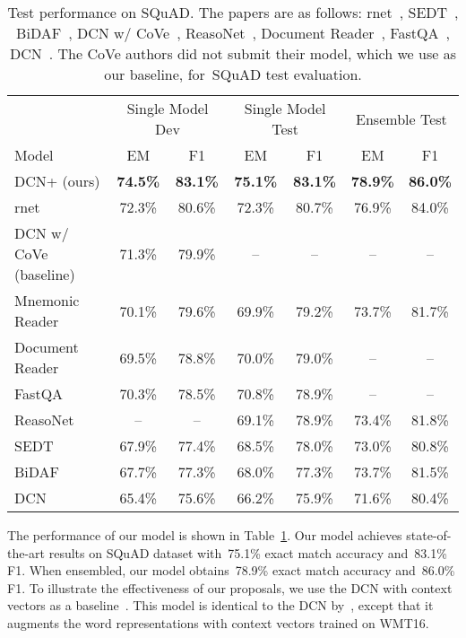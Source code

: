 \documentclass{article} \usepackage{iclr2018_conference,times}
\newcommand{\squad}{SQuAD\xspace}
\newcommand{\devemours}{74.5\%\xspace}
\newcommand{\devfours}{83.1\%\xspace}
\newcommand{\emours}{75.1\%\xspace}
\newcommand{\fours}{83.1\%\xspace}
\newcommand{\emoursensemble}{78.9\%\xspace}
\newcommand{\foursensemble}{86.0\%\xspace}
\newcommand{\devemdcn}{65.4\%\xspace}
\newcommand{\devfdcn}{75.6\%\xspace}
\newcommand{\emdcn}{66.2\%\xspace}
\newcommand{\fdcn}{75.9\%\xspace}
\newcommand{\emdcnensemble}{71.6\%\xspace}
\newcommand{\fdcnensemble}{80.4\%\xspace}
\newcommand{\devembidaf}{67.7\%\xspace}
\newcommand{\devfbidaf}{77.3\%\xspace}
\newcommand{\embidaf}{68.0\%\xspace}
\newcommand{\fbidaf}{77.3\%\xspace}
\newcommand{\embidafensemble}{73.7\%\xspace}
\newcommand{\fbidafensemble}{81.5\%\xspace}
\newcommand{\devemsedtbidaf}{67.9\%\xspace}
\newcommand{\devfsedtbidaf}{77.4\%\xspace}
\newcommand{\emsedtbidaf}{68.5\%\xspace}
\newcommand{\fsedtbidaf}{78.0\%\xspace}
\newcommand{\emsedtbidafensemble}{73.0\%\xspace}
\newcommand{\fsedtbidafensemble}{80.8\%\xspace}
\newcommand{\devemmr}{70.1\%\xspace}
\newcommand{\devfmr}{79.6\%\xspace}
\newcommand{\emmr}{69.9\%\xspace}
\newcommand{\fmr}{79.2\%\xspace}
\newcommand{\emmrensemble}{73.7\%\xspace}
\newcommand{\fmrensemble}{81.7\%\xspace}
\newcommand{\devemrnet}{72.3\%\xspace}
\newcommand{\devfrnet}{80.6\%\xspace}
\newcommand{\emrnet}{72.3\%\xspace}
\newcommand{\frnet}{80.7\%\xspace}
\newcommand{\emrnetensemble}{76.9\%\xspace}
\newcommand{\frnetensemble}{84.0\%\xspace}
\newcommand{\devemdocreader}{69.5\%\xspace}
\newcommand{\devfdocreader}{78.8\%\xspace}
\newcommand{\emdocreader}{70.0\%\xspace}
\newcommand{\fdocreader}{79.0\%\xspace}
\newcommand{\devemfastqa}{70.3\%\xspace}
\newcommand{\devffastqa}{78.5\%\xspace}
\newcommand{\emfastqa}{70.8\%\xspace}
\newcommand{\ffastqa}{78.9\%\xspace}
\newcommand{\emreasonet}{69.1\%\xspace}
\newcommand{\freasonet}{78.9\%\xspace}
\newcommand{\emreasonetensemble}{73.4\%\xspace}
\newcommand{\freasonetensemble}{81.8\%\xspace}
\newcommand{\emcove}{71.3\%\xspace}
\newcommand{\fcove}{79.9\%\xspace}
\begin{document}
\begin{table}[ht!]
\vspace{-3mm}
\centering
\begin{tabular}{lcccccc}
\toprule
    & \multicolumn{2}{c}{Single Model Dev} & \multicolumn{2}{c}{Single Model Test} & \multicolumn{2}{c}{Ensemble Test} \\
\cmidrule(lr){2-3} \cmidrule(lr){4-5} \cmidrule(lr){6-7}
Model & EM & F1 & EM & F1 & EM & F1 \\
\midrule
DCN+ (ours) & \textbf{\devemours} & \textbf{\devfours} & \textbf{\emours} & \textbf{\fours} & \textbf{\emoursensemble} & \textbf{\foursensemble} \\
rnet & \devemrnet & \devfrnet & \emrnet & \frnet & \emrnetensemble & \frnetensemble \\
DCN w/ CoVe (baseline) & \emcove & \fcove & -- & -- & -- & -- \\
Mnemonic Reader & \devemmr & \devfmr & \emmr & \fmr & \emmrensemble & \fmrensemble \\
Document Reader & \devemdocreader & \devfdocreader & \emdocreader & \fdocreader & -- & -- \\
FastQA & \devemfastqa & \devffastqa & \emfastqa & \ffastqa & -- & -- \\
ReasoNet & -- & -- & \emreasonet & \freasonet & \emreasonetensemble & \freasonetensemble \\
SEDT & \devemsedtbidaf & \devfsedtbidaf & \emsedtbidaf & \fsedtbidaf & \emsedtbidafensemble & \fsedtbidafensemble \\
BiDAF & \devembidaf & \devfbidaf & \embidaf & \fbidaf & \embidafensemble & \fbidafensemble \\
DCN & \devemdcn & \devfdcn & \emdcn & \fdcn & \emdcnensemble & \fdcnensemble \\
\bottomrule
\end{tabular}
\vspace{1mm}
\caption{
Test performance on \squad.
The papers are as follows: rnet~\citep{rnet}, SEDT~\citep{LiuHWYN17}, BiDAF~\citep{Seo2016BidirectionalAF}, DCN w/ CoVe~\citep{McCann2017Learned}, ReasoNet~\citep{shen2017reasonet}, Document Reader~\citep{Chen2017ReadingWT},
FastQA~\citep{Weissenborn2017MakingNQ}, DCN~\citep{xiong2016dynamic}.
The CoVe authors did not submit their model, which we use as our baseline, for~\squad test evaluation.
}
\vspace{-2mm}
\label{table:model-results}
\end{table}


The performance of our model is shown in Table~\ref{table:model-results}.
Our model achieves state-of-the-art results on \squad dataset with~\emours exact match accuracy and~\fours F1.
When ensembled, our model obtains~\emoursensemble exact match accuracy and~\foursensemble F1.
To illustrate the effectiveness of our proposals, we use the DCN with context vectors as a baseline~\citep{McCann2017Learned}.
This model is identical to the DCN by~\citet{xiong2016dynamic}, except that it augments the word representations with context vectors trained on WMT16.
\end{document}
